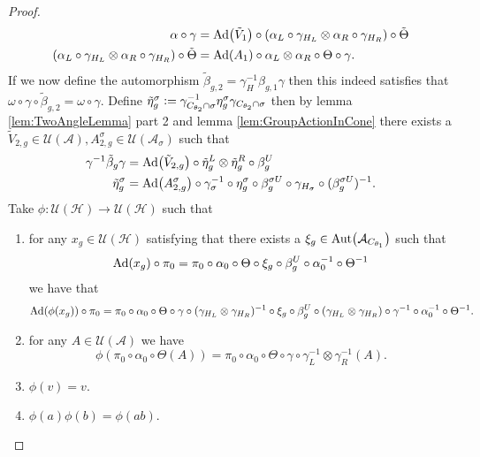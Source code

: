 \documentclass[12pt,a4paper,twoside]{article}
\newcommand{\defeq}{\vcentcolon=}
\let\originalleft\left
\let\originalright\right
\renewcommand{\left}{\mathopen{}\mathclose\bgroup\originalleft}
\renewcommand{\right}{\aftergroup\egroup\originalright}
\newcommand{\UU}{\mathcal U}
\newcommand{\HH}{\mathcal H}
\renewcommand{\AA}{\mathcal A}
\newcommand{\Ad}[1]{\textrm{Ad}\left(#1\right)}
\newcommand{\Aut}[1]{\textrm{Aut}\left(#1\right)}
\theoremstyle{definition}
\numberwithin{equation}{section}
\begin{document}
\begin{proof}
\begin{align}
		\alpha\circ\gamma&=\Ad{\tilde V_1}\circ(\alpha_L\circ\gamma_{H_L}\otimes\alpha_R\circ\gamma_{H_R})\circ\tilde\Theta\\
		(\alpha_L\circ\gamma_{H_L}\otimes\alpha_R\circ\gamma_{H_R})\circ\tilde\Theta&=\Ad{A_1}\circ \alpha_L\otimes\alpha_R\circ\Theta\circ\gamma.
	\end{align}
	If we now define the automorphism $\tilde{\beta}_{g,2}=\gamma^{-1}_H\beta_{g,1}\gamma$ then this indeed satisfies that $\omega\circ\gamma\circ\tilde{\beta}_{g,2}=\omega\circ\gamma$. Define $\tilde\eta_g^\sigma\defeq\gamma_{C_{\theta_2}\cap\sigma}^{-1}\eta_g^\sigma\gamma_{C_{\theta_2}\cap\sigma}$ then by lemma \ref{lem:TwoAngleLemma} part 2 and lemma \ref{lem:GroupActionInCone} there exists a $\tilde V_{2,g}\in\UU(\AA),A_{2,g}^{\sigma}\in\UU(\AA_\sigma)$ such that
	\begin{align}
	\gamma^{-1}\tilde{\beta}_g\gamma&=\Ad{\tilde V_{2,g}}\circ\tilde{\eta}_g^L\otimes\tilde{\eta}_g^R\circ\beta_g^U\\
	\tilde{\eta}_g^\sigma&=\Ad{A_{2,g}^\sigma}\circ\gamma_{\sigma}^{-1}\circ\eta_g^\sigma\circ\beta_g^{\sigma U}\circ\gamma_{H_\sigma}\circ(\beta_g^{\sigma U})^{-1}.
	\end{align}
	Take $\phi:\UU(\HH)\rightarrow \UU(\HH)$ such that
	\begin{enumerate}
		\item for any $x_g\in\UU(\HH)$ satisfying that there exists a $\xi_g\in\Aut{\AA_{C_{\theta_1}}}$ such that
		\begin{equation}
			\Ad{x_g}\circ\pi_0=\pi_0\circ\alpha_0\circ\Theta\circ\xi_g\circ\beta_g^U\circ\alpha_0^{-1}\circ\Theta^{-1}
		\end{equation}
		we have that
		\begin{equation}
			\Ad{\phi(x_g)}\circ\pi_0=\pi_0\circ\alpha_0\circ\Theta\circ\gamma\circ(\gamma_{H_L}\otimes\gamma_{H_R})^{-1}\circ\xi_g\circ\beta_g^U\circ(\gamma_{H_L}\otimes\gamma_{H_R})\circ\gamma^{-1}\circ\alpha_0^{-1}\circ\Theta^{-1}.
		\end{equation}
		\item for any $A\in\UU(\AA)$ we have
		\begin{equation}
			\phi(\pi_0\circ\alpha_0\circ\Theta(A))=\pi_0\circ\alpha_0\circ\Theta\circ\gamma\circ\gamma_{L}^{-1}\otimes\gamma_R^{-1}(A).
		\end{equation}
		\item $\phi(v)=v.$
		\item $\phi(a)\phi(b)=\phi(ab).$
	\end{enumerate}

\end{proof}
\end{document}
